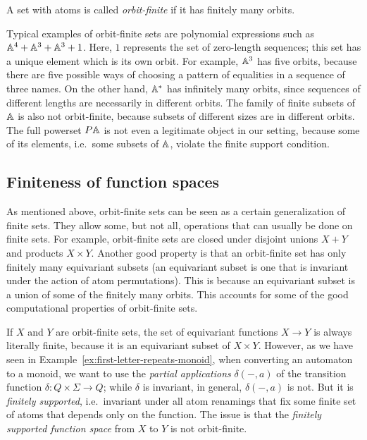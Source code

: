 \documentclass[a4paper,UKenglish,cleveref, autoref, numberwithinsect, thm-restate]{lipics-v2021}
\begin{document}
\begin{definition}
    A set with atoms is called \emph{orbit-finite} if it has finitely many orbits. 
\end{definition}

Typical examples of orbit-finite sets are polynomial expressions such as $\mathbb A^4 + \mathbb A^3 + \mathbb A^3 + 1$. Here, $1$ represents the set of zero-length sequences; this set has a unique element which is its own orbit.  For  example,  $\mathbb A^3$ has five orbits, because there are five possible ways of choosing a pattern of equalities in a sequence of three names. On the other hand,  $\mathbb A^*$ has infinitely many orbits, since sequences of different lengths are necessarily in different orbits.   The family of finite subsets of $\mathbb A$  is also  not orbit-finite, because subsets of different sizes are in different orbits. The full powerset $\powerset \atoms$ is not even a legitimate object in our setting, because some of its elements, i.e.~some subsets of $\mathbb A$, violate the finite support condition.

\subsection{Finiteness of function spaces}
\label{sec:orbit-finite-function-spaces}
As mentioned above, orbit-finite sets can be seen as  a certain generalization of finite sets. They allow some, but not all, operations that can usually be done on finite sets. For example, orbit-finite sets are closed under disjoint unions $X + Y$ and products $X \times Y$.  Another good property is that an orbit-finite set has only finitely many equivariant subsets (an equivariant subset is one that is invariant under the action of atom permutations). This is because an equivariant subset is a union of some of the finitely many orbits. This accounts for some of the good computational properties of orbit-finite sets.

If $X$ and $Y$ are orbit-finite sets, the set of equivariant functions $X \to Y$ is always literally finite, because it is an equivariant subset of $X\times Y$. However, as we have seen in Example~\ref{ex:first-letter-repeats-monoid}, when converting an automaton to a monoid, we want to use the \emph{partial applications} $\delta(-,a)$ of the transition function $\delta : Q \times \Sigma \to Q$; while $\delta$ is invariant, in general, $\delta(-,a)$ is not. But it is \emph{finitely supported}, i.e.~invariant under all atom renamings that fix some finite set of atoms that depends only on the function.
The issue is that the \emph{finitely supported function space} from $X$ to $Y$ is not orbit-finite.
\end{document}
